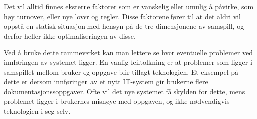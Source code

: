 \noindent
Det vil alltid finnes eksterne faktorer som er vanskelig eller umulig å påvirke, som høy turnover, eller nye lover og regler. Disse faktorene fører til at det aldri vil oppstå en statisk situasjon med hensyn på de tre dimensjonene av samspill, og derfor heller ikke optimaliseringen av disse.

\noindent
Ved å bruke dette rammeverket kan man lettere se hvor eventuelle problemer ved innføringen av systemet ligger. En vanlig feiltolkning er at problemer som ligger i samspillet mellom bruker og oppgave blir tillagt teknologien. Et eksempel på dette er dersom innføringen av et nytt IT-system gir brukerne flere dokumentasjonssoppgaver. Ofte vil det nye systemet få skylden for dette, mens problemet ligger i brukernes misnøye med oppgaven, og ikke nødvendigvis teknologien i seg selv.

